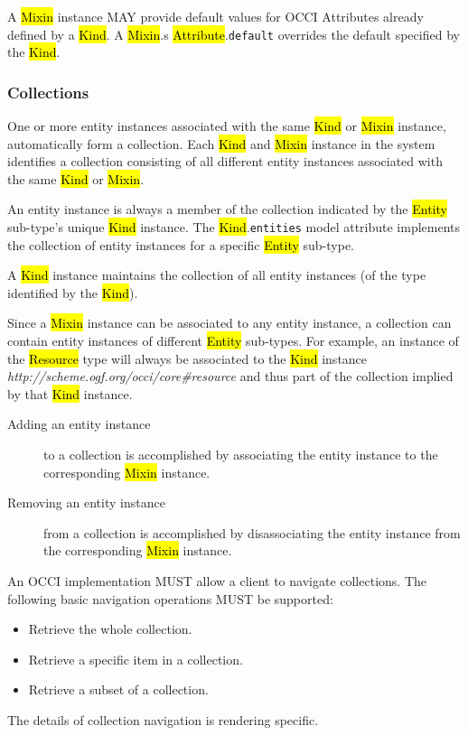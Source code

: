\documentclass[10pt,a4paper]{article}
\begin{document}
A \hl{Mixin} instance MAY provide default values for OCCI Attributes already
defined by a \hl{Kind}. A \hl{Mixin}.s \hl{Attribute}.{\tt default} overrides
the default specified by the \hl{Kind}.

\subsubsection{Collections}
\label{sec:collection}
One or more entity instances associated with the same \hl{Kind} or
\hl{Mixin} instance, automatically form a collection.  Each \hl{Kind}
and \hl{Mixin} instance in the system identifies a collection
consisting of all different entity instances associated with the same
\hl{Kind} or \hl{Mixin}.

An entity instance is always a member of the collection indicated by
the \hl{Entity} sub-type's unique \hl{Kind} instance.
The \hl{Kind}.{\tt entities} model attribute implements the collection
of entity instances for a specific \hl{Entity} sub-type.

A \hl{Kind}
instance maintains the collection of all entity instances (of the
type identified by the \hl{Kind}).

Since a \hl{Mixin} instance can be associated to any entity
instance, a collection can contain entity instances of different
\hl{Entity} sub-types.
For example, an instance of the \hl{Resource} type will always be
associated to the \hl{Kind} instance
\textit{http://scheme.ogf.org/occi/core\#resource} and thus part of
the collection implied by that \hl{Kind} instance.
%
\begin{description}
  \item[Adding an entity instance] to a collection is accomplished by
    associating the entity instance to the corresponding \hl{Mixin}
    instance.
  \item[Removing an entity instance] from a collection is
    accomplished by disassociating the entity instance from the
    corresponding \hl{Mixin} instance.
\end{description}
%
An OCCI implementation MUST allow a client to navigate
collections. The following basic navigation operations MUST be
supported:
%
\begin{itemize}
  \item Retrieve the whole collection.
  \item Retrieve a specific item in a collection.
  \item Retrieve a subset of a collection.
\end{itemize}
%
The details of collection navigation is rendering specific.
\end{document}
